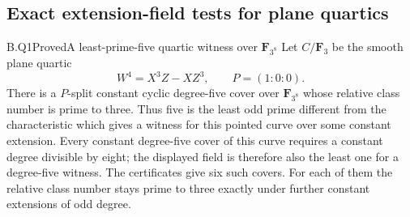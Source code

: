 \subsection{Exact extension-field tests for plane quartics}

\begin{claim}{B.Q1}{Proved}{A least-prime-five quartic witness over \(\mathbf F_{3^8}\)}
Let $C/\mathbf F_3$ be the smooth plane quartic
\[
                W^4=X^3Z-XZ^3,\qquad P=(1:0:0).
\]
There is a $P$-split constant cyclic degree-five cover over
$\mathbf F_{3^8}$ whose relative class number is prime to three.
Thus five is the least odd prime different from the characteristic
which gives a witness for this pointed curve over some constant
extension. Every constant degree-five cover of this curve requires
a constant degree divisible by eight; the displayed field is
therefore also the least one for a degree-five witness.
The certificates give six such covers. For each of them the
relative class number stays prime to three exactly under further
constant extensions of odd degree.
\end{claim}
